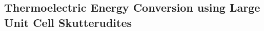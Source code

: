 \documentclass[aps,prb,preprint,superscriptaddress,amsmath,amssymb,floatfix]{revtex4}
\begin{document}
\subsection{\label{S-Motivation-Skutterudites}Thermoelectric Energy Conversion using Large Unit Cell Skutterudites}
\end{document}
